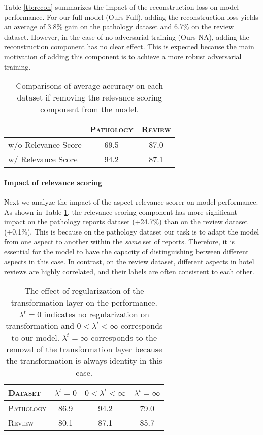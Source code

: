 Table \ref{tb:recon} summarizes the impact of the reconstruction loss on model performance. For our full model (Ours-Full), adding the reconstruction loss yields an average of 3.8\% gain on the pathology dataset and 6.7\% on the review dataset. However, in the case of no adversarial training (Ours-NA), adding the reconstruction component has no clear effect. This is expected because the main motivation of adding this component is to achieve a more robust adversarial training.

\begin{table}[t]
    \centering
    \begin{tabular}{lcc}
	\toprule
     & \textsc{Pathology} & \textsc{Review} \\
     \midrule
     w/o Relevance Score & 69.5 & 87.0 \\
     w/ Relevance Score & 94.2 & 87.1 \\
    \bottomrule
    \end{tabular}
    \caption{Comparisons of average accuracy on each dataset if removing the relevance scoring component from the model. }\label{tb:relevance}
\end{table}

\paragraph{Impact of relevance scoring} Next we analyze the impact of the aspect-relevance scorer on model performance. As shown in Table \ref{tb:relevance}, the relevance scoring component has more significant impact on the pathology reports dataset (+24.7\%) than on the review dataset (+0.1\%). This is because on the pathology dataset our task is to adapt the model from one aspect to another within the \emph{same} set of reports. Therefore, it is essential for the model to have the capacity of distinguishing between different aspects in this case. In contrast, on the review dataset, different aspects in hotel reviews are highly correlated, and their labels are often consistent to each other.

\begin{table}[t]
    \centering
    \begin{tabular}{lccc}
	\toprule
    \textsc{Dataset} & $\lambda^t=0$ & $0<\lambda^t<\infty$ & $\lambda^t=\infty$ \\
    \midrule
    \textsc{Pathology} & 86.9 & 94.2 & 79.0 \\
    \textsc{Review} & 80.1 & 87.1 & 85.7 \\
    \bottomrule
    \end{tabular}
    \caption{The effect of regularization of the transformation layer on the performance. $\lambda^t=0$ indicates no regularization on transformation and $0<\lambda^t<\infty$ corresponds to our model. $\lambda^t=\infty$ corresponds to the removal of the transformation layer because the transformation is always identity in this case. }\label{tb:transformation}
\end{table}


